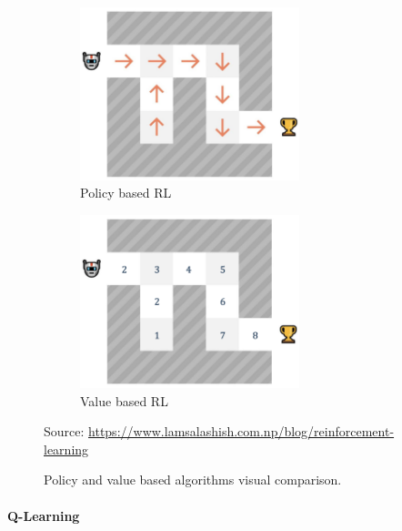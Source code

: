 \documentclass[12pt,a4paper,openright,twoside]{book}
\newcommand{\fonte}[1]{{\color{gray} \small \hypersetup{citecolor=gray} Source: #1}}
\begin{document}
\begin{figure}[t]
    \begin{subfigure}[b]{0.49\textwidth}
        \centering
        \includegraphics[width=0.7\textwidth]{figures/policy-based-rl.png}
        \caption{Policy based RL}
        \label{fig:policy-based-rl}
    \end{subfigure}
    \begin{subfigure}[b]{0.49\textwidth}
        \centering
        \includegraphics[width=0.7\textwidth]{figures/value-based-rl.png}
        \caption{Value based RL}
        \label{fig:value-based-rl}
    \end{subfigure}
\caption{Policy and value based algorithms visual comparison.}%
\fonte{\url{https://www.lamsalashish.com.np/blog/reinforcement-learning}}
\label{fig:rl-methods}
\end{figure}

\paragraph{Q-Learning}
\end{document}
